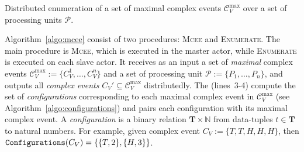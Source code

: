 \begin{algorithm}[H]
\caption{Distributed enumeration of a set of maximal complex events $\mathcal{C}^{\text{max}}_{V}$ over a set of processing units $\mathcal{P}$.}
\label{algo:mcee}
\end{algorithm}

Algorithm~\ref{algo:mcee} consist of two procedures: \textsc{Mcee} and \textsc{Enumerate}. The main procedure is \textsc{Mcee}, which is executed in the master actor, while \textsc{Enumerate} is executed on each slave actor. It receives as an input a set of \emph{maximal} complex events $\mathcal{C}^{\text{max}}_{V} := \{C^{1}_{V}, \ldots, C^{n}_{V}\}$ and a set of processing unit $\mathcal{P} := \{P_{1},\ldots, P_{n}\}$, and outputs all \emph{complex events} $C_{V}' \subseteq \mathcal{C}^{\text{max}}_{V}$ distributedly. The  (lines~3-4) compute the set of \emph{configurations} corresponding to each maximal complex event in $\mathcal{C}^{\text{max}}_{V}$ (see Algorithm~\ref{algo:configurations}) and pairs each configuration with its maximal complex event. A \emph{configuration} is a binary relation $\textbf{T} \times \mathbb{N}$ from data-tuples $t \in \textbf{T}$ to natural numbers. For example, given complex event $C_{V} := \{T, T, H, H, H\}$, then $\texttt{Configurations}(C_{V}) = \{ \{T, 2\}, \{H, 3\}\}$.



